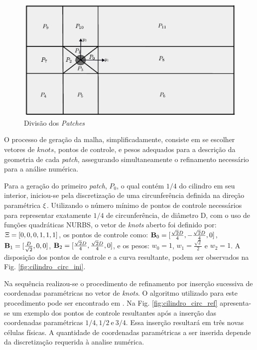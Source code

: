 \documentclass[tese_patricia]{subfiles}
\begin{document}
\begin{figure}[htb!]
	\centering 
	\includegraphics[scale=0.7,trim=0cm 0cm 0cm 0cm, clip=true]{Imagens/Cap3/cilindro_iga_patches.pdf}	
	\caption{Divisão dos \textit{Patches} }
	\label{fig:cilindro_IGA_patches}
\end{figure}

O processo de geração da malha, simplificadamente, consiste em se escolher vetores de $knots$, pontos de controle, e pesos adequados para a descrição da geometria de cada \textit{patch}, assegurando simultaneamente o refinamento necessário para a análise numérica.

Para a geração do primeiro \textit{patch}, $P_0$, o qual contém $1/4$ do cilindro em seu interior, iniciou-se pela discretização de uma circunferência definida na direção paramétrica $\xi$. Utilizando o número mínimo de pontos de controle necessários para representar exatamente $1/4$ de circunferência, de diâmetro D, com o uso de funções quadráticas NURBS, o vetor de \textit {knots} aberto foi definido por: $\Xi=\left[0,0,0,1,1,1\right]$, os pontos de controle como: $\mathbf{B}_0=[\frac{\sqrt{2}D}{4},-\frac{\sqrt{2}D}{4},0]$, $\mathbf{B}_1=[\frac{D}{\sqrt{2}},0,0]$, $\mathbf{B}_2=[\frac{\sqrt{2}D}{4},\frac{\sqrt{2}D}{4},0]$, e os pesos: $w_0 = 1$, $w_1 = \frac{\sqrt{2}}{2}$ e $w_2 = 1$. A disposição dos pontos de controle e a curva resultante, podem ser observados na Fig. \ref{fig:cilindro_circ_ini}.

Na sequência realizou-se o procedimento de refinamento por inserção sucessiva de coordenadas paramétricas no vetor de \textit{knots}. O algoritmo utilizado para este procedimento pode ser encontrado em . Na Fig. \ref{fig:cilindro_circ_ref} apresenta-se um exemplo dos pontos de controle resultantes após a inserção das coordenadas paramétricas $1/4, 1/2 \ \text{e} \ 3/4$. Essa inserção resultará em três novas células físicas. A quantidade de coordenadas paramétricas a ser inserida depende da discretização requerida à analise numérica.
\end{document}
